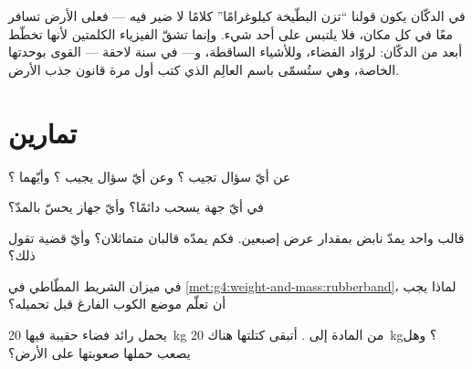 \begin{remark}\label{rem:g4:weight-and-mass:words}
في الدكّان يكون قولنا ``تزن البطّيخة كيلوغرامًا'' كلامًا لا ضير
فيه --- فعلى الأرض تسافر   معًا في كل مكان، فلا
يلتبس على أحد شيء. وإنما تشقّ الفيزياء الكلمتين لأنها تخطّط
أبعد من الدكّان: لروّاد الفضاء، وللأشياء الساقطة، و--- في سنة
لاحقة ---  القوى بوحدتها الخاصة، وهي  ستُسمّى باسم
العالِم الذي كتب أول مرة قانون جذب الأرض.
\end{remark}

\section{تمارين}

\begin{exercise}[$\star$]\label{exo:g4:weight-and-mass:1}
عن أيّ سؤال تجيب ؟ وعن أيّ سؤال يجيب ؟ وأيّهما ؟
\end{exercise}

\begin{exercise}[$\star$]\label{exo:g4:weight-and-mass:2}
في أيّ جهة يسحب  دائمًا؟ وأيّ جهاز يحسّ  بالمدّ؟
\end{exercise}

\begin{exercise}[$\star$]\label{exo:g4:weight-and-mass:3}
قالب واحد يمدّ نابض  بمقدار عرض إصبعين. فكم
يمدّه قالبان متماثلان؟ وأيّ قضية تقول ذلك؟
\end{exercise}

\begin{exercise}[$\star$]\label{exo:g4:weight-and-mass:4}
في ميزان الشريط المطّاطي في
\cref{met:g4:weight-and-mass:rubberband}، لماذا يجب أن تعلّم
موضع الكوب الفارغ قبل تحميله؟
\end{exercise}

\begin{exercise}[$\star$]\label{exo:g4:weight-and-mass:5}
يحمل رائد فضاء حقيبة فيها \qty{20}{kg} من المادة إلى .
أتبقى كتلتها هناك \qty{20}{kg}؟ وهل يصعب حملها صعوبتها على
الأرض؟
\end{exercise}

